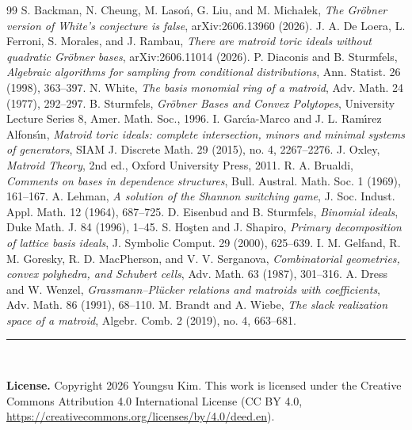 \documentclass[11pt,a4paper]{article}
\theoremstyle{plain}
\theoremstyle{definition}
\begin{document}
\begin{thebibliography}{99}
 S. Backman, N. Cheung, M. Laso\'n, G. Liu, and M. Micha\l{}ek, \emph{The Gr\"obner version of White's conjecture is false}, arXiv:2606.13960 (2026).
 J. A. De Loera, L. Ferroni, S. Morales, and J. Rambau, \emph{There are matroid toric ideals without quadratic Gr\"obner bases}, arXiv:2606.11014 (2026).
 P. Diaconis and B. Sturmfels, \emph{Algebraic algorithms for sampling from conditional distributions}, Ann. Statist. 26 (1998), 363--397.
 N. White, \emph{The basis monomial ring of a matroid}, Adv. Math. 24 (1977), 292--297.
 B. Sturmfels, \emph{Gr\"obner Bases and Convex Polytopes}, University Lecture Series 8, Amer. Math. Soc., 1996.
 I. Garc\'{\i}a-Marco and J. L. Ram\'{\i}rez Alfons\'{\i}n, \emph{Matroid toric ideals: complete intersection, minors and minimal systems of generators}, SIAM J. Discrete Math. 29 (2015), no. 4, 2267--2276.
 J. Oxley, \emph{Matroid Theory}, 2nd ed., Oxford University Press, 2011.
 R. A. Brualdi, \emph{Comments on bases in dependence structures}, Bull. Austral. Math. Soc. 1 (1969), 161--167.
 A. Lehman, \emph{A solution of the Shannon switching game}, J. Soc. Indust. Appl. Math. 12 (1964), 687--725.
 D. Eisenbud and B. Sturmfels, \emph{Binomial ideals}, Duke Math. J. 84 (1996), 1--45.
 S. Ho\c{s}ten and J. Shapiro, \emph{Primary decomposition of lattice basis ideals}, J. Symbolic Comput. 29 (2000), 625--639.
 I. M. Gelfand, R. M. Goresky, R. D. MacPherson, and V. V. Serganova, \emph{Combinatorial geometries, convex polyhedra, and Schubert cells}, Adv. Math. 63 (1987), 301--316.
 A. Dress and W. Wenzel, \emph{Grassmann--Pl\"ucker relations and matroids with coefficients}, Adv. Math. 86 (1991), 68--110.
 M. Brandt and A. Wiebe, \emph{The slack realization space of a matroid}, Algebr. Comb. 2 (2019), no. 4, 663--681.
\end{thebibliography}
\par\vfill
\noindent\rule{\linewidth}{0.4pt}\\[0.2em]
{\small\noindent\textbf{License.} Copyright {} 2026 Youngsu Kim. This work is licensed under the Creative Commons Attribution 4.0 International License (CC BY 4.0, \url{https://creativecommons.org/licenses/by/4.0/deed.en}).\par}
\end{document}
